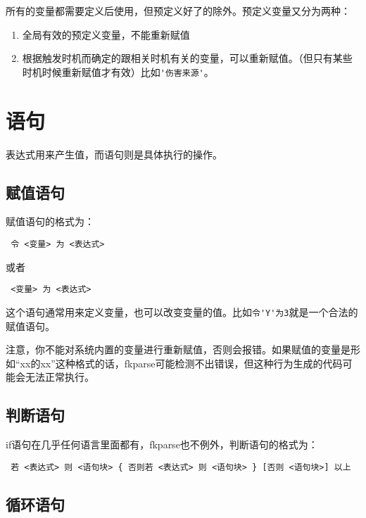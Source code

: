 所有的变量都需要定义后使用，但预定义好了的除外。预定义变量又分为两种：

\begin{enumerate}
 \item 全局有效的预定义变量，不能重新赋值
 \item 根据触发时机而确定的跟相关时机有关的变量，可以重新赋值。（但只有某些时机时候重新赋值才有效）比如\verb|'伤害来源'|。
\end{enumerate}

\section{语句}

表达式用来产生值，而语句则是具体执行的操作。

\subsection{赋值语句}

赋值语句的格式为：

\begin{verbatim}
 令 <变量> 为 <表达式>
\end{verbatim}

或者

\begin{verbatim}
 <变量> 为 <表达式>
\end{verbatim}

这个语句通常用来定义变量，也可以改变变量的值。比如\verb|令'Y'为3|就是一个合法的赋值语句。

注意，你不能对系统内置的变量进行重新赋值，否则会报错。如果赋值的变量是形如“xx的xx”这种格式的话，fkparse可能检测不出错误，但这种行为生成的代码可能会无法正常执行。

\subsection{判断语句}

if语句在几乎任何语言里面都有，fkparse也不例外，判断语句的格式为：

\begin{verbatim}
 若 <表达式> 则 <语句块> { 否则若 <表达式> 则 <语句块> } [否则 <语句块>] 以上
\end{verbatim}

\subsection{循环语句}

